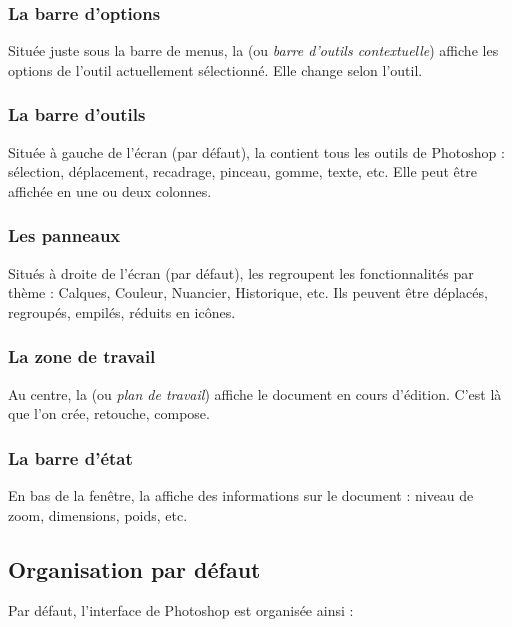 \subsubsection{La barre d'options}

Située juste sous la barre de menus, la  (ou \emph{barre d'outils contextuelle}) affiche les options de l'outil actuellement sélectionné. Elle change selon l'outil.

\subsubsection{La barre d'outils}

Située à gauche de l'écran (par défaut), la  contient tous les outils de Photoshop : sélection, déplacement, recadrage, pinceau, gomme, texte, etc. Elle peut être affichée en une ou deux colonnes.

\subsubsection{Les panneaux}

Situés à droite de l'écran (par défaut), les  regroupent les fonctionnalités par thème : Calques, Couleur, Nuancier, Historique, etc. Ils peuvent être déplacés, regroupés, empilés, réduits en icônes.

\subsubsection{La zone de travail}

Au centre, la  (ou \emph{plan de travail}) affiche le document en cours d'édition. C'est là que l'on crée, retouche, compose.

\subsubsection{La barre d'état}

En bas de la fenêtre, la  affiche des informations sur le document : niveau de zoom, dimensions, poids, etc.

\subsection{Organisation par défaut}

Par défaut, l'interface de Photoshop est organisée ainsi :

